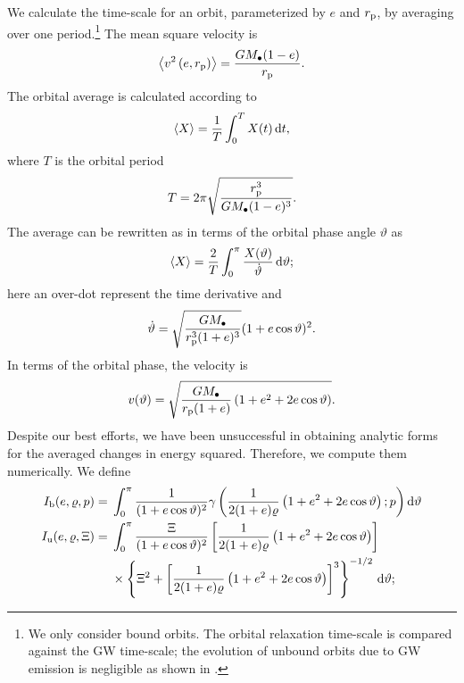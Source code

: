 We calculate the time-scale for an orbit, parameterized by $e$ and $r_\mathrm{p}$, by averaging over one period.\footnote{We only consider bound orbits. The orbital relaxation time-scale is compared against the GW time-scale; the evolution of unbound orbits due to GW emission is negligible as shown in .} The mean square velocity is
\begin{equation}
\left\langle v^2\left(e,r_\mathrm{p}\right)\right\rangle = \dfrac{GM_\bullet(1 - e)}{r_\mathrm{p}}.
\end{equation}
The orbital average is calculated according to \citep[section 2.2b]{Spitzer1987Jr}
\begin{equation}
\left\langle X\right\rangle = \dfrac{1}{T}\int_{0}^{T}{X(t)}\,\mathrm{d}{t},
\end{equation}
where $T$ is the orbital period
\begin{equation}
T = 2\pi\sqrt{\dfrac{r_\mathrm{p}^3}{GM_\bullet(1-e)^{3}}}.
\end{equation}
The average can be rewritten as in terms of the orbital phase angle $\vartheta$ as
\begin{equation}
\left\langle X\right\rangle = \dfrac{2}{T}\int_{0}^{\pi}{\dfrac{X(\vartheta)}{\dot{\vartheta}}}\,\mathrm{d}{\vartheta};
\end{equation}
here an over-dot represent the time derivative and
\begin{equation}
\dot{\vartheta} = \sqrt{\dfrac{GM_\bullet}{r_\mathrm{p}^3(1+e)^3}}(1 + e \cos\vartheta)^2.
\end{equation}
In terms of the orbital phase, the velocity is
\begin{equation}
v(\vartheta) = \sqrt{\dfrac{GM_\bullet}{r_\mathrm{p}(1+e)}\left(1 + e^2 + 2e\cos\vartheta\right)}.
\end{equation}
Despite our best efforts, we have been unsuccessful in obtaining analytic forms for the averaged changes in energy squared. Therefore, we compute them numerically. We define
\begin{align}
I_\mathrm{b}(e,\varrho,p) = {} & \int_{0}^{\pi}{\dfrac{1}{(1 + e \cos\vartheta)^2}\gamma\left(\dfrac{1}{2(1+e)\varrho}\left(1+e^2+2e\cos\vartheta\right);p\right)}\,\mathrm{d}{\vartheta} \\
I_\mathrm{u}(e,\varrho,\Xi) = {} & \int_{0}^{\pi} \dfrac{\Xi}{(1 + e \cos\vartheta)^2}\left[\dfrac{1}{2(1+e)\varrho}\left(1+e^2+2e\cos\vartheta\right)\right] \nonumber \\*
 {} & \times \left\{\Xi^2 + \left[\dfrac{1}{2(1+e)\varrho}\left(1+e^2+2e\cos\vartheta\right)\right]^3\right\}^{-1/2} \,\mathrm{d}\vartheta;
\end{align}
